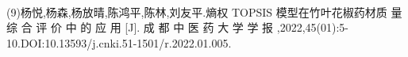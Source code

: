 \documentclass[preview]{standalone}
\begin{document}
\begin{center}
\quad\\(9)杨悦,杨森,杨放晴,陈鸿平,陈林,刘友平.熵权 TOPSIS 模型在竹叶花椒药材质 量 综 合 评 价 中 的 应 用 [J]. 成 都 中 医 药 大 学 学 报 ,2022,45(01):5-10.DOI:10.13593/j.cnki.51-1501/r.2022.01.005.\quad\\
\end{center}
\end{document}
